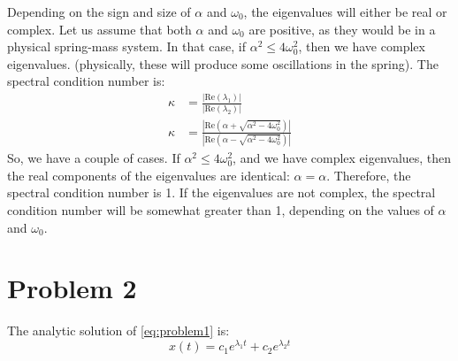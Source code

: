 \documentclass[10pt,letterpaper,notitlepage]{article}
\begin{document}
	Depending on the sign and size of $\alpha$ and $\omega_0$, the eigenvalues will either be real or complex. Let us assume that both $\alpha$ and $\omega_0$ are positive, as they would be in a physical spring-mass system. In that case, if $\alpha^2 \leq 4 \omega_0^2$, then we have complex eigenvalues. (physically, these will produce some oscillations in the spring).
	The spectral condition number is:
	\begin{equation}
		\begin{aligned}
			\kappa &= \frac{|\text{Re}(\lambda_1)|}{|\text{Re}(\lambda_2)|} \\
			\kappa &= \frac{| \text{Re}(\alpha + \sqrt{\alpha^2 - 4 \omega_0^2})|}{|\text{Re}(\alpha - \sqrt{\alpha^2 - 4 \omega_0^2})|}
		\end{aligned}
	\end{equation}
	So, we have a couple of cases. If $\alpha^2 \leq 4 \omega_0^2$, and we have complex eigenvalues, then the real components of the eigenvalues are identical: $\alpha=\alpha$. Therefore, the spectral condition number is 1.
	If the eigenvalues are not complex, the spectral condition number will be somewhat greater than 1, depending on the values of $\alpha$ and $\omega_0$.
	\section{Problem 2}
	The analytic solution of \cref{eq:problem1} is:
	\begin{equation}
		x(t) = c_1 e^{\lambda_1 t} + c_2 e^{\lambda_2 t}
	\end{equation}
\end{document}
